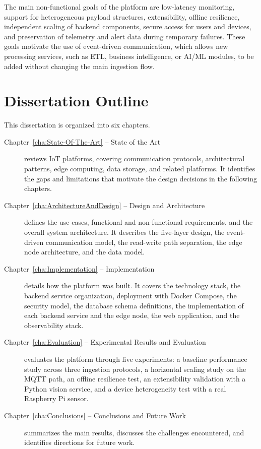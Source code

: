 The main non-functional goals of the platform are low-latency monitoring,
support for heterogeneous payload structures, extensibility, offline
resilience, independent scaling of backend components, secure access for users
and devices, and preservation of telemetry and alert data during temporary
failures. These goals motivate the use of event-driven communication, which
allows new processing services, such as \gls{ETL}, business intelligence, or
\gls{AI}/\gls{ML} modules, to be added without changing the main ingestion
flow.

\section{Dissertation Outline}

This dissertation is organized into six chapters.

\begin{description}
	\item[Chapter~\ref{cha:State-Of-The-Art} -- State of the Art] reviews \gls{IoT} platforms, covering communication protocols, architectural patterns, edge computing, data storage, and related platforms. It identifies the gaps and limitations that motivate the design decisions in the following chapters.
	\item[Chapter~\ref{cha:ArchitectureAndDesign} -- Design and Architecture] defines the use cases, functional and non-functional requirements, and the overall system architecture. It describes the five-layer design, the event-driven communication model, the read-write path separation, the edge node architecture, and the data model.
	\item[Chapter~\ref{cha:Implementation} -- Implementation] details how the platform was built. It covers the technology stack, the backend service organization, deployment with Docker Compose, the security model, the database schema definitions, the implementation of each backend service and the edge node, the web application, and the observability stack.
	\item[Chapter~\ref{cha:Evaluation} -- Experimental Results and Evaluation] evaluates the platform through five experiments: a baseline performance study across three ingestion protocols, a horizontal scaling study on the \gls{MQTT} path, an offline resilience test, an extensibility validation with a Python vision service, and a device heterogeneity test with a real Raspberry Pi sensor.
	\item[Chapter~\ref{cha:Conclusions} -- Conclusions and Future Work] summarizes the main results, discusses the challenges encountered, and identifies directions for future work.
\end{description}
